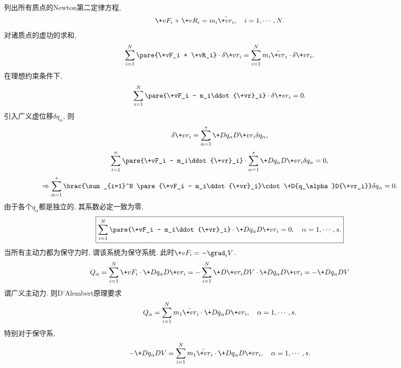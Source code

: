 \documentclass{ctexart}
\begin{document}
列出所有质点的Newton第二定律方程,
\[ \+vF_i + \+vR_i = m_i\ddot{\+vr_i},\quad  i = 1,\cdots, N. \]
对诸质点的虚功的求和,
\[ \sum_{i=1}^N \pare{\+vF_i + \+vR_i}\cdot\delta\+vr_i = \sum_{i=1}^N m_i\ddot{\+vr}_i \cdot\delta\+vr_i. \]
在理想约束条件下,
\[ \sum_{i=1}^N \pare{\+vF_i - m_i\ddot{\+vr}_i}\cdot\delta\+vr_i = 0. \]
引入广义虚位移$\delta q_\alpha$, 则
\[ \delta \+vr_i = \sum_{\alpha=1}^s \+D{q_\alpha}D{\+vr_i}\delta q_\alpha, \]
\[ \sum_{i=1}^n\pare{\+vF_i - m_i\ddot{\+vr}_i}\cdot\sum_{\alpha=1}^s \+D{q_\alpha}D{\+vr_i}\delta q_\alpha = 0, \]
\[ \Rightarrow \sum_{\alpha=1}^s \brac{\sum_{i=1}^N \pare{\+vF_i - m_i\ddot{\+vr}_i}\cdot\+D{q_\alpha}D{\+vr_i}} \delta q_\alpha = 0. \]
由于各个$q_\alpha$都是独立的, 其系数必定一致为零,
\[ \boxed{\sum_{i=1}^N \pare{\+vF_i - m_i\ddot{\+vr}_i}\cdot\+D{q_\alpha}D{\+vr_i} = 0,\quad \alpha = 1,\cdots, s.} \]
当所有主动力都为保守力时, 谓该系统为保守系统. 此时$\+vF_i = -\grad_i V$.
\[ Q_\alpha = \sum_{i=1}^N \+vF_i \cdot \+D{q_\alpha}D{\+vr_i} = -\sum_{i=1}^N \+D{\+vr_i}D{V}\cdot\+D{q_\alpha}D{\+vr_i} = -\+D{q_\alpha}D{V} \]
谓广义主动力. 则D'Alembert原理要求
\[ Q_\alpha = \sum_{i=1}^N m_1\ddot{\+vr}_i\cdot\+D{q_\alpha}D{\+vr_i},\quad \alpha = 1,\cdots,s. \]
特别对于保守系,
\begin{equation}
    \label{eq:保守力的DAlembert原理}
    -\+D{q_\alpha}D{V} = \sum_{i=1}^N m_1\ddot{\+vr}_i\cdot\+D{q_\alpha}D{\+vr_i},\quad \alpha = 1,\cdots,s. 
\end{equation}
\end{document}
